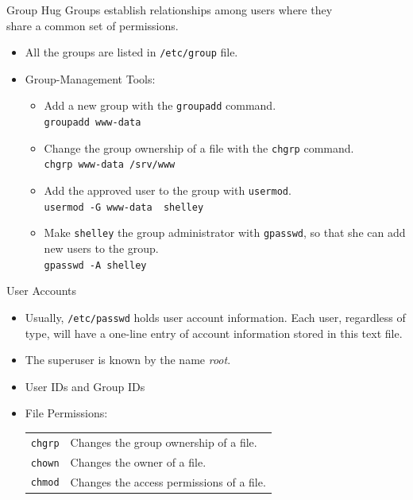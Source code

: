 \documentclass[14pt,aspectratio=1610]{beamer}
\begin{document}
\begin{frame}{Group Hug}
  Groups establish relationships among users where they\\
  share a common set of permissions.
\begin{itemize}
\item<2-> All the groups are listed in \lstinline{/etc/group} file.
\item<3-> Group-Management Tools:
\begin{itemize}
\item Add a new group with the \lstinline{groupadd} command.\\
  \lstinline{groupadd www-data}
\item Change the group ownership of a file with the \lstinline{chgrp} command.\\
  \lstinline{chgrp www-data /srv/www}
\item Add the approved user to the group with \lstinline{usermod}.\\
  \lstinline{usermod -G www-data  shelley}
\item Make \texttt{shelley} the group administrator with \lstinline{gpasswd}, so that she can add new users to the group.\\
  \lstinline{gpasswd -A shelley}
\end{itemize}
\end{itemize}
\end{frame}

\begin{frame}{User Accounts}
\begin{itemize}
\item Usually, \texttt{/etc/passwd} holds user account information. Each user, regardless of type, will have a one-line entry of account information stored in this text file.
\item The superuser is known by the name \textit{root}.
\item User IDs and Group IDs
\item File Permissions:
  \begin{tabular}{@{$\bullet$ }ll}
    \lstinline{chgrp} & Changes the group ownership of a file.\\
    \lstinline{chown} & Changes the owner of a file.\\
    \lstinline{chmod} & Changes the access permissions of a file.\\
  \end{tabular}

\end{itemize}
\end{frame}
\end{document}
